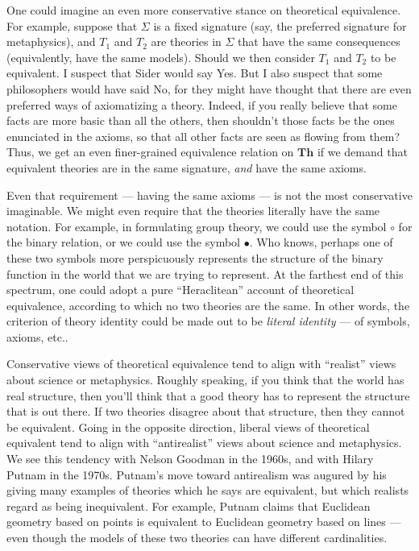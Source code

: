 One could imagine an even more conservative stance on theoretical
equivalence.  For example, suppose that $\Sigma$ is a fixed signature
(say, the preferred signature for metaphysics), and $T_1$ and $T_2$
are theories in $\Sigma$ that have the same consequences
(equivalently, have the same models).  Should we then consider $T_1$
and $T_2$ to be equivalent.  I suspect that Sider would say Yes.  But
I also suspect that some philosophers would have said No, for they
might have thought that there are even preferred ways of axiomatizing
a theory.  Indeed, if you really believe that some facts are more
basic than all the others, then shouldn't those facts be the ones
enunciated in the axioms, so that all other facts are seen as flowing
from them?  Thus, we get an even finer-grained equivalence relation on
$\mathbf{Th}$ if we demand that equivalent theories are in the same
signature, {\it and} have the same axioms.

Even that requirement --- having the same axioms --- is not the most
conservative imaginable.  We might even require that the theories
literally have the same notation.  For example, in formulating group
theory, we could use the symbol $\circ$ for the binary relation, or we
could use the symbol $\bullet$.  Who knows, perhaps one of these two
symbols more perspicuously represents the structure of the binary
function in the world that we are trying to represent.  At the
farthest end of this spectrum, one could adopt a pure ``Heraclitean''
account of theoretical equivalence, according to which no two theories
are the same.  In other words, the criterion of theory identity could
be made out to be {\it literal identity} --- of symbols, axioms, etc..

Conservative views of theoretical equivalence tend to align with
``realist'' views about science or metaphysics.  Roughly speaking, if
you think that the world has real structure, then you'll think that a
good theory has to represent the structure that is out there.  If two
theories disagree about that structure, then they cannot be
equivalent.  Going in the opposite direction, liberal views of
theoretical equivalent tend to align with ``antirealist'' views about
science and metaphysics.  We see this tendency with Nelson Goodman in
the 1960s, and with Hilary Putnam in the 1970s.  Putnam's move toward
antirealism was augured by his giving many examples of theories which
he says are equivalent, but which realists regard as being
inequivalent.  For example, Putnam claims that Euclidean geometry
based on points is equivalent to Euclidean geometry based on lines ---
even though the models of these two theories can have different
cardinalities.

